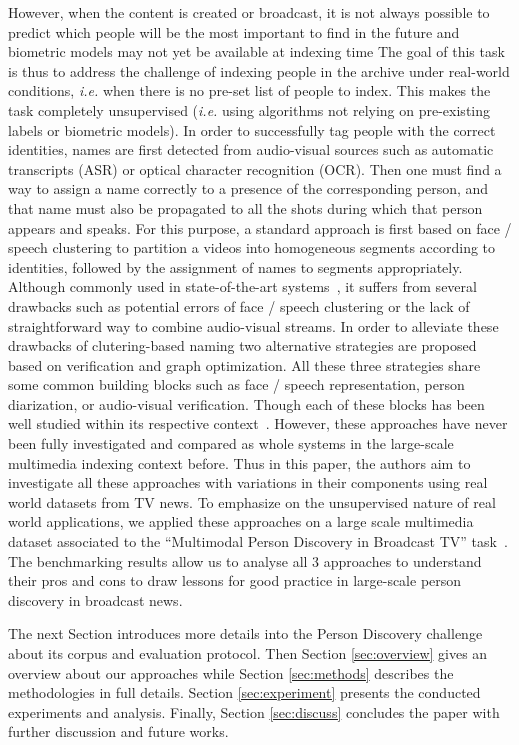 However, when the content is created or broadcast, it is not always possible to predict which people will be the most important to find in the future and biometric models may not yet be available at indexing time The goal of this task is thus to address the challenge of indexing people in the archive under real-world conditions, \emph{i.e.} when there is no pre-set list of people to index.
%
This makes the task completely unsupervised (\emph{i.e.} using algorithms not relying on pre-existing labels or biometric models).
%
In order to successfully tag people with the correct identities, names are first detected from audio-visual sources such as automatic transcripts (ASR) or optical character recognition (OCR). Then one must find a way to assign a name correctly to a presence of the corresponding person, and that name must also be propagated to all the shots during which that person appears and speaks. 
%
For this purpose, a standard approach is first based on face / speech clustering to partition a videos into homogeneous segments according to identities, followed by the assignment of names to segments appropriately.
%
Although commonly used in state-of-the-art systems~\cite{nam2015, gravier2015, 1 more from repere}, it suffers from several drawbacks such as potential errors of face / speech clustering or the lack of straightforward way to combine audio-visual streams.
%
In order to alleviate these drawbacks of clutering-based naming %
two alternative strategies are proposed based on verification and graph optimization. 
%
All these three strategies share some common building blocks such as face / speech representation, person diarization, or audio-visual verification. Though each of these blocks has been well studied within its respective context~\cite{recog,veri,rep}. 
%
However, these approaches have never been fully investigated and compared as whole systems in the large-scale multimedia indexing context before. Thus in this paper, the authors aim to investigate all these approaches with variations in their components using real world datasets from TV news. 
%
To emphasize on the unsupervised nature of real world applications, we applied these approaches on a large scale multimedia dataset associated to the ``Multimodal Person Discovery in Broadcast TV'' task~\cite{POIGNANT--MEDIAEVAL--2015,bredin2016mediaeval}.
%
The benchmarking results allow us to analyse all 3 approaches to understand their pros and cons to draw lessons for good practice in large-scale person discovery in broadcast news.

The next Section introduces more details into the Person Discovery challenge about its corpus and evaluation protocol.
Then Section \ref{sec:overview} gives an overview about our approaches while Section \ref{sec:methods} describes the methodologies in full details.
Section \ref{sec:experiment} presents the conducted experiments and analysis.
%
Finally, Section \ref{sec:discuss} concludes the paper 
with further discussion and future works.

\endinput
